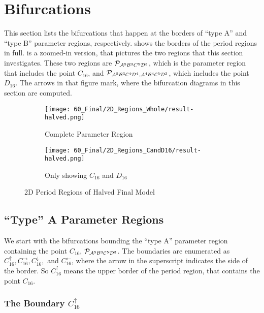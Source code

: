 \section{Bifurcations}

This section lists the bifurcations that happen at the borders of ``type A'' and ``type B'' parameter regions, respectively.
 shows the borders of the period regions in full.
 is a zoomed-in version, that pictures the two regions that this section investigates.
These two regions are $\mathcal{P}_{\mathcal{A}^5\mathcal{B}^3C^5\mathcal{D}^3}$, which is the parameter region that includes the point $C_{16}$, and $\mathcal{P}_{\mathcal{A}^5\mathcal{B}^3\mathcal{C}^4\mathcal{D}^4, \mathcal{A}^4\mathcal{B}^4\mathcal{C}^5\mathcal{D}^3}$, which includes the point $D_{16}$.
The arrows in that figure mark, where the bifurcation diagrams in this section are computed.

\begin{figure}
    \centering
    \begin{subfigure}{0.4\textwidth}
        \centering
        \texttt{[image: 60\_Final/2D\_Regions\_Whole/result-halved.png]}
        \caption{Complete Parameter Region}
        \label{fig:final.regions.whole.halved}
    \end{subfigure}
    \begin{subfigure}{0.4\textwidth}
        \centering
        \texttt{[image: 60\_Final/2D\_Regions\_CandD16/result-halved.png]}
        \caption{Only showing $C_{16}$ and $D_{16}$}
        \label{fig:final.regions.CandD16.halved}
    \end{subfigure}
    \caption{2D Period Regions of Halved Final Model}
\end{figure}

\subsection{``Type'' A Parameter Regions}

We start with the bifurcations bounding the ``type A'' parameter region containing the point $C_{16}$, $\mathcal{P}_{\mathcal{A}^5\mathcal{B}^3\mathcal{C}^5\mathcal{D}^3}$.
The boundaries are enumerated as $C_{16}^\uparrow, C_{16}^\rightarrow, C_{16}^\downarrow,$ and $C_{16}^\leftarrow$, where the arrow in the superscript indicates the side of the border.
So $C_{16}^\uparrow$ means the upper border of the period region, that contains the point $C_{16}$.

\subsubsection{The Boundary $C_{16}^\uparrow$}

